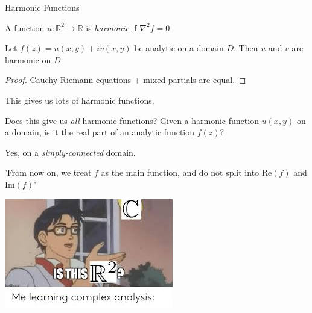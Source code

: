 \documentclass{beamer}
\newcommand{\R}{\mathbb{R}}
\begin{document}
\begin{frame}{Harmonic Functions}
\begin{definition}
A function $u:\R^2\to\R$ is \emph{harmonic} if $\nabla^2f=0$
\end{definition}

\begin{lemma}Let $f(z)=u(x,y)+iv(x,y)$ be analytic on a domain $D$.  Then $u$ and $v$ are harmonic on $D$
\end{lemma}
\begin{proof} Cauchy-Riemann equations + mixed partials are equal.
\end{proof}
This gives us lots of harmonic functions.  
\begin{block}{Does this give us \emph{all} harmonic functions?}
Given a harmonic function $u(x,y)$ on a domain, is it the real part of an analytic function $f(z)$?
\end{block}
Yes, on a \emph{simply-connected} domain.
\end{frame}

\begin{frame}{'From now on, we treat $f$ as the main function, and do not split into $\textrm{Re}(f)$ and $\textrm{Im}(f)$'}

\includegraphics[width=\textwidth,height=0.8\textheight,keepaspectratio]{IsThisMeme.jpeg}
  
\end{frame}
\end{document}
